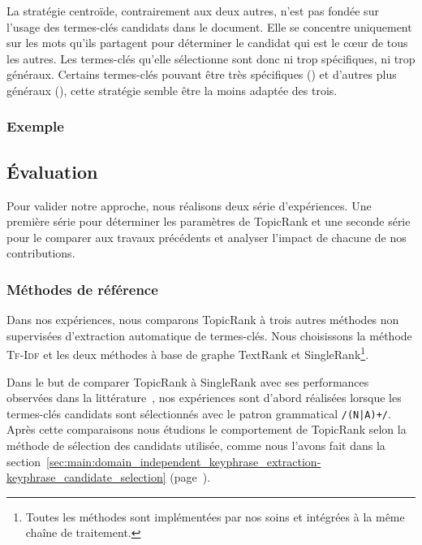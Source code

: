         La stratégie centroïde, contrairement aux deux autres, n'est pas fondée
        sur l'usage des termes-clés candidats dans le document. Elle se
        concentre uniquement sur les mots qu'ils partagent pour déterminer le
        candidat qui est le c\oe{}ur de tous les autres. Les termes-clés qu'elle
        sélectionne sont donc ni trop spécifiques, ni trop généraux. Certains
        termes-clés pouvant être très spécifiques () et d'autres
        plus généraux (), cette stratégie semble être la moins
        adaptée des trois.

      \subsubsection{Exemple}
      \label{subsubsec:main:domain_independent_keyphrase_extraction-unsupervised_automatic_keyphrase_extraction-topicrank-example}

    \subsection{Évaluation}
    \label{subsec:main:domain_independent_keyphrase_extraction-unsupervised_automatic_keyphrase_extraction-evaluation}
      Pour valider notre approche, nous réalisons deux série d'expériences. Une
      première série pour déterminer les paramètres de TopicRank et
      une seconde série pour le comparer aux travaux précédents et analyser
      l'impact de chacune de nos contributions.
      
      \subsubsection{Méthodes de référence}
      \label{subsubsec:main:domain_independent_keyphrase_extraction-unsupervised_automatic_keyphrase_extraction-evaluation-baselines}
        Dans nos expériences, nous comparons TopicRank à trois autres
        méthodes non supervisées d'extraction automatique de termes-clés. Nous
        choisissons la méthode \textsc{Tf-Idf} et les deux méthodes à base de
        graphe TextRank et SingleRank\footnote{Toutes les méthodes sont
        implémentées par nos soins et intégrées à la même chaîne de
        traitement.}.
        
        Dans le but de comparer TopicRank à SingleRank avec ses performances
        observées dans la littérature~\cite{hassan2010conundrums}, nos
        expériences sont d'abord réalisées lorsque les termes-clés candidats
        sont sélectionnés avec le patron grammatical \texttt{/(N|A)+/}. Après
        cette comparaisons nous étudions le comportement de TopicRank selon la
        méthode de sélection des candidats utilisée, comme nous l'avons fait
        dans la
        section~\ref{sec:main:domain_independent_keyphrase_extraction-keyphrase_candidate_selection}
        (page~\pageref{sec:main:domain_independent_keyphrase_extraction-keyphrase_candidate_selection}).

